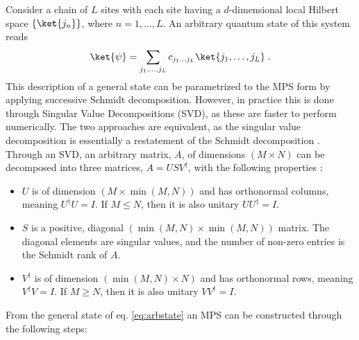 Consider a chain of $L$ sites with each site having a $d$-dimensional local Hilbert space $\{ \ket{j_n} \}$, where $n = 1, \ldots, L$. An arbitrary quantum state of this system reads
\begin{equation}
	\ket{\psi} = \sum_{j_1, \ldots, j_L} c_{j_1 \ldots j_L} \ket{j_1, \ldots, j_L} \; .
	\label{eq:arbstate}
\end{equation}
This description of a general state can be parametrized to the MPS form by applying successive Schmidt decomposition. However, in practice this is done through Singular Value Decompositions (SVD), as these are faster to perform numerically. The two approaches are equivalent, as the singular value decomposition is essentially a restatement of the Schmidt decomposition \cite{Pathak2013}.
Through an SVD, an arbitrary matrix, $A$, of dimensions $(M \times N)$ can be decomposed into three matrices, $A = U S V^{\dag}$, with the following properties \cite{schollwock}:
\begin{itemize}
\item
$U$ is of dimension $(M \times \min(M,N))$ and has orthonormal columns, meaning $U^{\dag}U = I$. If $M \leq N$, then it is also unitary $U U^{\dag} = I$.

\item
$S$ is a positive, diagonal $(\min(M,N) \times \min(M,N))$ matrix. The diagonal elements are singular values, and the number of non-zero entries is the Schmidt rank of $A$.

\item
$V^{\dag}$ is of dimension $(\min(M,N) \times N)$ and has orthonormal rows, meaning $V^{\dag}V = I$. If $M \geq N$, then it is also unitary $V V^{\dag} = I$.
\end{itemize} 
From the general state of eq. \eqref{eq:arbstate} an MPS can be constructed through the following steps:
